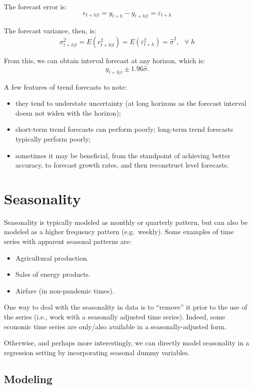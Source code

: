 \documentclass[
  oneside]{book}
\providecommand{\tightlist}{%
  \setlength{\itemsep}{0pt}\setlength{\parskip}{0pt}}
\begin{document}
The forecast error is: \[e_{t+h|t} = y_{t+h} - y_{t+h|t} = \varepsilon_{t+h}\]

The forecast variance, then, is: \[\sigma_{t+h|t}^2 = E(e_{t+h|t}^2) =  E(\varepsilon_{t+h}^2) = \hat{\sigma}^2,\;~~\forall\;h\]

From this, we can obtain interval forecast at any horizon, which is: \[y_{t+h|t} \pm 1.96 \hat{\sigma}.\]

A few features of trend forecasts to note:

\begin{itemize}
\tightlist
\item
  they tend to understate uncertainty (at long horizons as the forecast interval doesn not widen with the horizon);
\item
  short-term trend forecasts can perform poorly; long-term trend forecasts typically perform poorly;
\item
  sometimes it may be beneficial, from the standpoint of achieving better accuracy, to forecast growth rates, and then reconstruct level forecasts.
\end{itemize}

\hypertarget{seasonality}{%
\chapter{Seasonality}\label{seasonality}}

Seasonality is typically modeled as monthly or quarterly pattern, but can also be modeled as a higher frequency pattern (e.g.~weekly). Some examples of time series with apparent seasonal patterns are:

\begin{itemize}
\tightlist
\item
  Agricultural production.
\item
  Sales of energy products.
\item
  Airfare (in non-pandemic times).
\end{itemize}

One way to deal with the seasonality in data is to ``remove'' it prior to the use of the series (i.e., work with a seasonally adjusted time series). Indeed, some economic time series are only/also available in a seasonally-adjusted form.

Otherwise, and perhaps more interestingly, we can directly model seasonality in a regression setting by incorporating seasonal dummy variables.

\hypertarget{modeling-1}{%
\section{Modeling}\label{modeling-1}}
\end{document}
